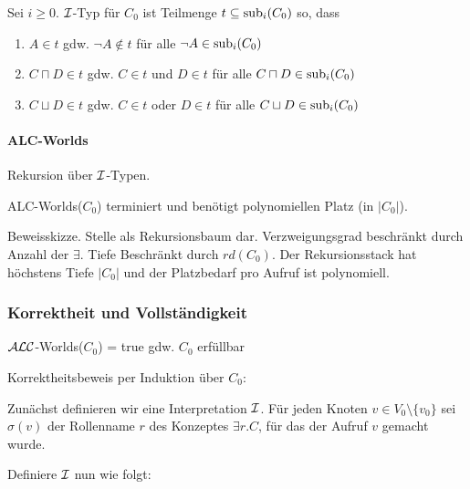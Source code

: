 \begin{definition}[$i$-Typ]

Sei $i \geq 0$. $\mathcal{I}$-Typ für $C_{0}$ ist Teilmenge
$t \subseteq \sub_{i}\left( C_{0} \right)$ so, dass

\begin{enumerate}
\def\labelenumi{\arabic{enumi}.}
\item
  $A \in t$ gdw. $\neg A \notin t$ für alle
  $\neg A \in \sub_{i}\left( C_{0} \right)$
\item
  $C \sqcap D \in t$ gdw. $C \in t$ und $D \in t$ für alle
  $C \sqcap D \in \sub_{i}\left( C_{0} \right)$
\item
  $C \sqcup D \in t$ gdw. $C \in t$ oder $D \in t$ für alle
  $C \sqcup D \in \sub_{i}\left( C_{0} \right)$
\end{enumerate}
\end{definition}

\paragraph{ALC-Worlds}\label{alc-worlds-1}

Rekursion über $\mathcal{I}$-Typen.

\begin{proposition}
ALC-Worlds($C_{0}$) terminiert und benötigt polynomiellen Platz (in $|C_0|$).
\end{proposition}

Beweisskizze. Stelle als Rekursionsbaum dar. Verzweigungsgrad beschränkt durch Anzahl der $\exists$. Tiefe Beschränkt durch $rd(C_{0})$. Der Rekursionsstack hat höchstens Tiefe $\left| C_{0} \right|$ und der Platzbedarf pro Aufruf ist polynomiell.

\subsubsection{Korrektheit und Vollständigkeit}\label{proposition-5.18}

\begin{proposition}
$\mathcal{A}\mathcal{L}\mathcal{C}$-Worlds($C_0$) = true gdw. $C_0$ erfüllbar
\end{proposition}

Korrektheitsbeweis per Induktion über $C_{0}$:

Zunächst definieren wir eine Interpretation $\mathcal{I}$. Für jeden Knoten $v \in V_0 \setminus \{v_0\}$ sei $\sigma (v)$ der Rollenname $r$ des Konzeptes $\exists r.C$, für das der Aufruf $v$ gemacht wurde.

Definiere $\mathcal{I}$ nun wie folgt:

